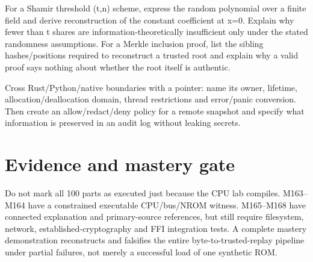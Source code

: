 For a Shamir threshold (t,n) scheme, express the random polynomial over a finite field and derive reconstruction of the constant coefficient at x=0. Explain why fewer than t shares are information-theoretically insufficient only under the stated randomness assumptions. For a Merkle inclusion proof, list the sibling hashes/positions required to reconstruct a trusted root and explain why a valid proof says nothing about whether the root itself is authentic.

Cross Rust/Python/native boundaries with a pointer: name its owner, lifetime, allocation/deallocation domain, thread restrictions and error/panic conversion. Then create an allow/redact/deny policy for a remote snapshot and specify what information is preserved in an audit log without leaking secrets.

\section{Evidence and mastery gate}\label{appendix-11f73b337e37-evidence-and-mastery-gate}

Do not mark all 100 parts as executed just because the CPU lab compiles. M163--M164 have a constrained executable CPU/bus/NROM witness. M165--M168 have connected explanation and primary-source references, but still require filesystem, network, established-cryptography and FFI integration tests. A complete mastery demonstration reconstructs and falsifies the entire byte-to-trusted-replay pipeline under partial failures, not merely a successful load of one synthetic ROM.

